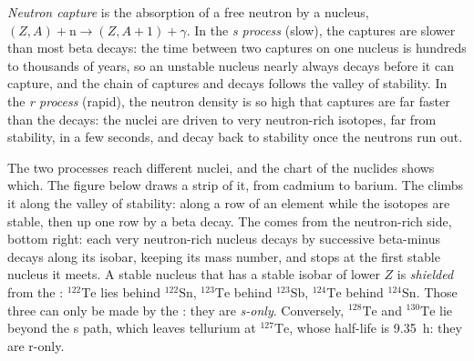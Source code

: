 \begin{definition}\label{def:b3:origin-of-elements:s-process}
\emph{Neutron capture} is the absorption of a
free neutron by a nucleus, $(Z, A) + \mathrm{n} \to (Z, A+1) + \gamma$.
In the \emph{s process} (slow), the captures
are slower than most beta decays: the time between two captures on one
nucleus is hundreds to thousands of years, so an unstable nucleus
nearly always decays before it can capture, and the chain of captures
and decays follows the valley of stability. In the
\emph{r process} (rapid), the neutron density
is so high that captures are far faster than the decays: the nuclei are
driven to very neutron-rich isotopes, far from stability, in a few
seconds, and decay back to stability once the neutrons run out.
\end{definition}

The two processes reach different nuclei, and the chart of the nuclides
shows which. The figure below draws a strip of it, from cadmium to
barium. The  climbs it along the valley of stability: along a
row of an element while the isotopes are stable, then up one row by a
beta decay. The  comes from the neutron-rich side, bottom
right: each very neutron-rich nucleus decays by successive beta-minus
decays along its isobar, keeping its mass number, and stops at the first
stable nucleus it meets. A stable nucleus that has a stable isobar of
lower $Z$ is \emph{shielded} from the : $^{122}\mathrm{Te}$
lies behind $^{122}\mathrm{Sn}$, $^{123}\mathrm{Te}$ behind
$^{123}\mathrm{Sb}$, $^{124}\mathrm{Te}$ behind $^{124}\mathrm{Sn}$.
Those three can only be made by the : they are
\emph{s-only}. Conversely, $^{128}\mathrm{Te}$ and $^{130}\mathrm{Te}$
lie beyond the s path, which leaves tellurium at $^{127}\mathrm{Te}$,
whose half-life is \qty{9.35}{h}: they are r-only.

